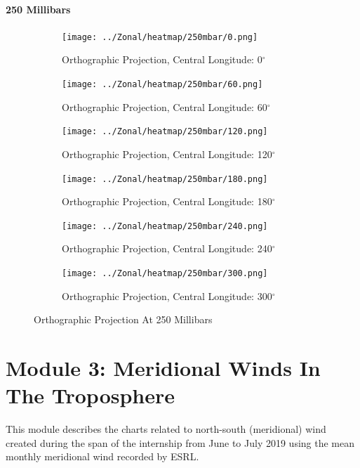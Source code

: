\documentclass[hidelinks]{article}
\begin{document}
\paragraph{250 Millibars}
\begin{figure}[h!]
	\centering
	\begin{subfigure}[b]{0.45545\linewidth}
		\texttt{[image: ../Zonal/heatmap/250mbar/0.png]}
		\caption{Orthographic Projection, Central Longitude: 0$^\circ$}
	\end{subfigure}
	\begin{subfigure}[b]{0.45545\linewidth}
		\texttt{[image: ../Zonal/heatmap/250mbar/60.png]}
		\caption{Orthographic Projection, Central Longitude: 60$^\circ$}
	\end{subfigure}
	\begin{subfigure}[b]{0.45545\linewidth}
		\texttt{[image: ../Zonal/heatmap/250mbar/120.png]}
		\caption{Orthographic Projection, Central Longitude: 120$^\circ$}
	\end{subfigure}
	\begin{subfigure}[b]{0.45545\linewidth}
		\texttt{[image: ../Zonal/heatmap/250mbar/180.png]}
		\caption{Orthographic Projection, Central Longitude: 180$^\circ$}
	\end{subfigure}
	\begin{subfigure}[b]{0.45545\linewidth}
		\texttt{[image: ../Zonal/heatmap/250mbar/240.png]}
		\caption{Orthographic Projection, Central Longitude: 240$^\circ$}
	\end{subfigure}
	\begin{subfigure}[b]{0.45545\linewidth}
		\texttt{[image: ../Zonal/heatmap/250mbar/300.png]}
		\caption{Orthographic Projection, Central Longitude: 300$^\circ$}
	\end{subfigure}
	\caption{Orthographic Projection At 250 Millibars}
\end{figure}
\newpage
\section{Module 3: Meridional Winds In The Troposphere}
This module describes the charts related to north-south (meridional) wind created during the span of the internship from June to July 2019 using the mean monthly meridional wind recorded by ESRL.
\end{document}
